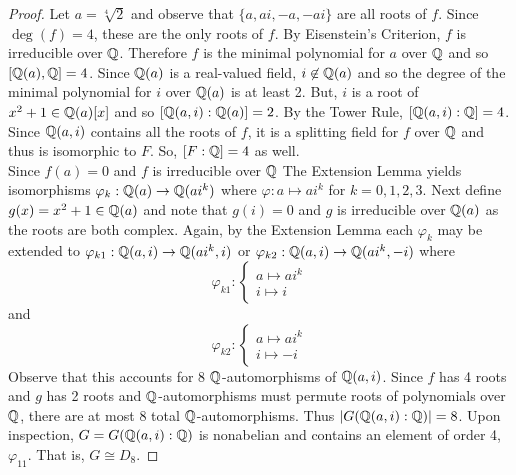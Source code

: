 \documentclass[../../AlgebraQualSolutions.tex]{subfiles}
\begin{document}
\begin{proof}
    Let $a = \sqrt[4]{2}$ and  observe that $\{a,ai,-a,-ai\}$ are all roots of $f$. Since $\deg(f) = 4$, these are the only roots of $f$. By Eisenstein's Criterion, $f$ is irreducible over $\mathbb{Q}$. Therefore $f$ is the minimal polynomial for $a$ over $\mathbb{Q}$ and so $[\mathbb{Q}(a),\mathbb{Q}] = 4$. Since $\mathbb{Q}(a)$ is a real-valued field, $i \not\in \mathbb{Q}(a)$ and so the degree of the minimal polynomial for $i$ over $\mathbb{Q}(a)$ is at least 2. But, $i$ is a root of $x^2 + 1 \in \mathbb{Q}(a)[x]$ and so $[\mathbb{Q}(a,i): \mathbb{Q}(a)] = 2$. By the Tower Rule, $[\mathbb{Q}(a,i): \mathbb{Q}] = 4$. Since $\mathbb{Q}(a,i)$ contains all the roots of $f$, it is a splitting field for $f$ over $\mathbb{Q}$ and thus is isomorphic to $F$. So, $[F: \mathbb{Q}] = 4$ as well.\\

    Since $f(a) = 0$ and $f$ is irreducible over $\mathbb{Q}$ The Extension Lemma yields isomorphisms $\varphi_k: \mathbb{Q}(a) \to \mathbb{Q}(ai^k)$ where $\varphi:a \mapsto ai^k$ for $k = 0,1,2,3$. Next define $g(x) = x^2 + 1 \in \mathbb{Q}(a)$ and note that $g(i) = 0$ and $g$ is irreducible over $\mathbb{Q}(a)$ as the roots are both complex. Again, by the Extension Lemma each $\varphi_k$ may be extended to $\varphi_{k1}: \mathbb{Q}(a,i) \to \mathbb{Q}(ai^k, i)$ or $\varphi_{k2}: \mathbb{Q}(a,i) \to \mathbb{Q}(ai^k,-i)$ where
        \[\varphi_{k1}: \begin{cases}
            a \mapsto ai^k\\
            i \mapsto i
        \end{cases}\]
    and
        \[\varphi_{k2}: \begin{cases}
        a \mapsto ai^k\\
        i \mapsto -i
    \end{cases}\]
    Observe that this accounts for 8 $\mathbb{Q}$-automorphisms of $\mathbb{Q}(a,i)$. Since $f$ has 4 roots and $g$ has 2 roots and $\mathbb{Q}$-automorphisms must permute roots of polynomials over $\mathbb{Q}$, there are at most 8 total $\mathbb{Q}$-automorphisms. Thus $|G(\mathbb{Q}(a,i): \mathbb{Q})| = 8$. Upon inspection, $G = G(\mathbb{Q}(a,i): \mathbb{Q})$ is nonabelian and contains an element of order 4, $\varphi_{11}$. That is, $G \cong D_8$. 
\end{proof}
\end{document}
